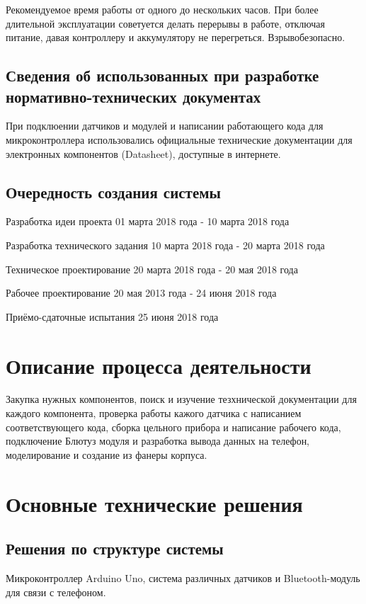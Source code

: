 \documentclass[12pt,a4paper]{scrartcl}
\begin{document}
 	Рекомендуемое время работы от одного до нескольких часов. При более длительной эксплуатации советуется делать перерывы в работе, отключая питание, давая контроллеру и аккумулятору не перегреться. Взрывобезопасно.
 	
 		\subsection{Сведения об использованных при разработке нормативно-технических документах }
 	При подклюении датчиков и модулей и написании работающего кода для микроконтроллера использовались официальные технические документации для электронных компонентов (Datasheet), доступные в интернете.
 	
 		\subsection{Очередность создания системы}
 	Разработка идеи проекта 01 марта 2018 года - 10 марта 2018 года
 	
 	Разработка технического задания 10 марта 2018 года - 20 марта 2018 года
 	
 	Техническое проектирование 20 марта 2018 года - 20 мая 2018 года
 	
 	Рабочее проектирование 20 мая 2013 года - 24 июня 2018 года
 	
 	Приёмо-сдаточные испытания  25 июня 2018 года
 	
 	\section{Описание процесса деятельности}
 	Закупка нужных компонентов, поиск и изучение тезхнической документации для каждого компонента, проверка работы кажого датчика с написанием соответствующего кода, сборка цельного прибора и написание рабочего кода, подключение Блютуз модуля и разработка вывода данных на телефон, моделирование и создание из фанеры корпуса. 
 	
 	\section{Основные технические решения}
 		\subsection{Решения по структуре системы }
 	Микроконтроллер Arduino Uno, система различных датчиков и Bluetooth-модуль для связи с телефоном.
 	
\end{document}
